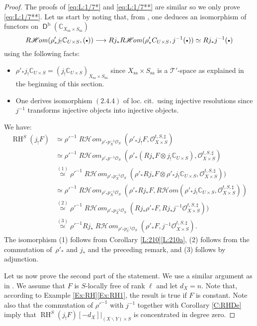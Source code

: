 \documentclass[english]{smfart}
\numberwithin{subsection}{section}
\def\sho{\mathcal{O}}\let\cO\sho
\def\sht{\mathcal{T}}
\newcommand{\C}{\mathbb{C}}\let\CC\C
\newcommand{\Rhom}{R\shhom}
\newcommand{\shhom}{\mathcal{H}\!\mathit{om}}\let\ho\shhom
\DeclareMathOperator{\rh}{\mathit{R}\shhom}
\DeclareMathOperator{\RH}{RH}
\newcommand{\rb}{\mathrm{b}}
\newcommand{\sa}{\mathrm{sa}}
\newcommand{\XS}{X\times S}
\DeclareMathOperator{\rD}{\mathsf{D}}
\let\setminus\smallsetminus
\def\loccit{loc.\kern3pt cit.{}\xspace}
\newcommand{\cbbullet}{{\raisebox{1pt}{$\sbullet$}}}
\newcommand{\sbullet}{{\scriptscriptstyle\bullet}}
\newcommand{\pOS}{p^{-1}\sho_S}
\numberwithin{equation}{section}
\theoremstyle{plain}
\theoremstyle{definition}
\def\to{\mathchoice{\longrightarrow}{\rightarrow}{\rightarrow}{\rightarrow}}
\begin{document}
\begin{proof}
The proofs of \eqref{eq:L:1/7*} and \eqref{eq:L:1/7**} are similar so we only prove \eqref{eq:L:1/7**}. Let us start by noting that, from \cite[(2.4.4),\,Prop.\,2.4.4]{K-S01}, one deduces an isomorphism of functors on $\rD^\rb(\C_{X_{\sa}\times S_{\sa}})$
$$\Rhom(\rho'_*j_!\C_{U\times S}, (\cbbullet))\to Rj_*\Rhom(\rho'_*C_{U\times S}, j^{-1}(\cbbullet))\simeq Rj_*j^{-1}(\cbbullet)$$ using the following facts:
\begin{itemize}
\item{$\rho'_*j_!\C_{U\times S}=(j_!\C_{U\times S})_{X_{\sa}\times S_{\sa}}$ since $X_{\sa}\times S_{\sa}$ is a $\sht'$-space as explained in the beginning of this section.}
\item{One derives isomorphism $(2.4.4)$ of \loccit\ using injective resolutions since $j^{-1}$ transforms injective objects into injective objects.}
\end{itemize}
We have:
\begin{align*}
\RH^S(j_!F)&\simeq \rho'^{-1} \rh_{\rho'_*p_{X}^{-1}\sho_S}(\rho'_*j_!F, \sho^{t,S,\sharp}_{\XS})\\
&\simeq \rho'^{-1} \rh_{\rho'_*\pOS}(\rho'_*(Rj_*F\otimes j_!\CC_{U\times S}) , \sho^{t,S,\sharp}_{\XS})\\
&\overset{(1)}\simeq \rho'^{-1} \rh_{\rho'_*p_{X}^{-1}\sho_S}(\rho'_*Rj_*F\otimes\rho'_* j_!\C_{U\times S}, \sho^{t,S,\sharp}_{\XS}))\\
&\simeq \rho'^{-1} \rh_{\rho'_*p_{X}^{-1}\sho_S}(\rho'_*Rj_*F, \Rhom(\rho'_*j_!\C_{U\times S}, \sho^{t,S,\sharp}_{\XS}))\\
&\overset{(2)}\simeq \rho'^{-1} \rh_{\rho'_*p_{X}^{-1}\sho_S}(Rj_*\rho'_*F, Rj_*j^{-1}\sho^{t,S,\sharp}_{\XS}))\\
&\overset{(3)}\simeq \rho'^{-1} Rj_*\rh_{\rho'_*p_{U}^{-1}\sho_S}(\rho'_*F, j^{-1}\sho^{t,S,\sharp}_{\XS}).
\end{align*}
The isomorphism (1) follows from Corollary \ref {L:210}\eqref{L:210a}, (2) follows from the commutation of~$\rho'_*$ and $j_*$ and the preceding remark, and (3) follows by adjunction.

Let us now prove the second part of the statement. We use a similar argument as in \cite[Lem.\,7.4]{Kashiwara84}. We assume that $F$ is $S$-locally free of rank $\ell$ and let $d_X=n$. Note that, according to Example \ref{Ex:RH}\eqref{Ex:RH1}, the result is true if $F$ is constant. Note also that the commutation of $\rho'^{-1}$ with $j^{-1}$ together with Corollary \ref{C:RHDe} imply that $\RH^S(j_!F)[-d_X]|_{(X\setminus Y)\times S}$ is concentrated in degree zero.


\end{proof}
\end{document}

